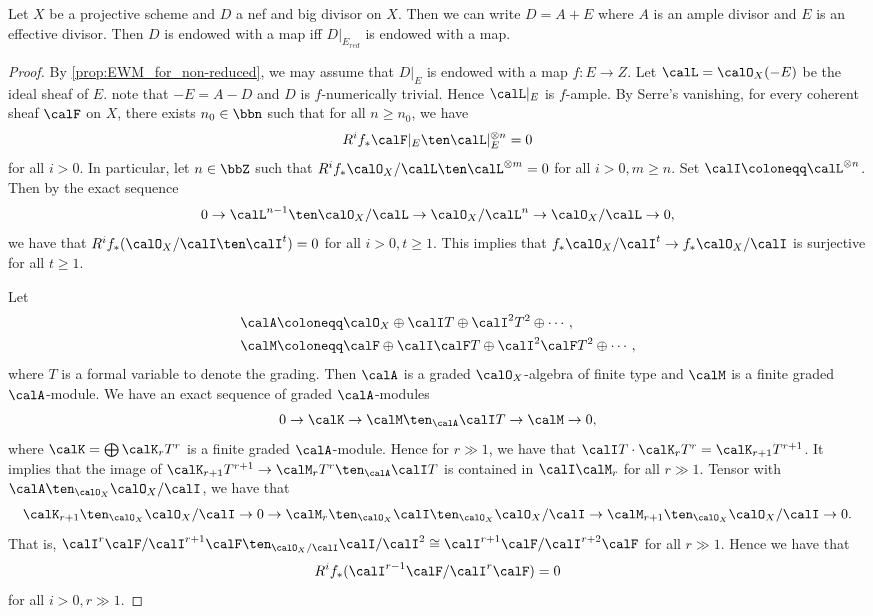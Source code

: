     \begin{proposition}\label{prop:EWM_nef_big_iff_effective_locus_char_p}
        Let \(X\) be a projective scheme and \(D\) a nef and big divisor on \(X\).
        Then we can write \(D = A + E\) where \(A\) is an ample divisor and \(E\) is an effective divisor.
        Then \(D\) is endowed with a map iff \(D|_{E_{red}}\) is endowed with a map.
    \end{proposition}
    \begin{proof}
        By \cref{prop:EWM_for_non-reduced}, we may assume that \(D|_E\) is endowed with a map \(f: E \to Z\).
        Let \(\calL = \calO_X(-E)\) be the ideal sheaf of \(E\).
        note that \(-E = A - D\) and \(D\) is \(f\)-numerically trivial.
        Hence \(\calL|_E\) is \(f\)-ample.
        By Serre's vanishing, for every coherent sheaf \(\calF\) on \(X\), 
        there exists \(n_0 \in \bbn\) such that for all \(n \geq n_0\), we have 
        \[ R^if_* \calF|_E \ten \calL|_{E}^{\otimes n} =  0 \]
        for all \(i > 0\).
        In particular, let \(n \in \bbZ\) such that \(R^if_* \calO_X/\calL \ten \calL^{\otimes m} = 0\) for all \(i > 0,m\geq n\).
        Set \(\calI \coloneqq \calL^{\otimes n}\).
        Then by the exact sequence
        \[ 0 \to \calL^{n-1} \ten \calO_X/\calL \to \calO_X/\calL^n \to \calO_X/\calL \to 0, \]
        we have that \(R^if_* (\calO_X/\calI \ten \calI^t) = 0\) for all \(i > 0, t\geq 1\).
        This implies that \(f_*\calO_X/\calI^t \to f_*\calO_X/\calI\) is surjective for all \(t \geq 1\).

        Let 
        \begin{align*}
            \calA &\coloneqq \calO_X \oplus \calI T \oplus \calI^2 T^2 \oplus \cdots, \\
            \calM &\coloneqq \calF \oplus \calI \calF T \oplus \calI^2 \calF T^2 \oplus \cdots,
        \end{align*}
        where \(T\) is a formal variable to denote the grading.
        Then \(\calA\) is a graded \(\calO_X\)-algebra of finite type and \(\calM\) is a finite graded \(\calA\)-module.
        We have an exact sequence of graded \(\calA\)-modules
        \[ 0 \to \calK \to \calM \ten_{\calA} \calI T \to \calM \to 0, \]
        where \(\calK = \bigoplus \calK_r T^r\) is a finite graded \(\calA\)-module.
        Hence for \(r \gg 1\), we have that \(\calI T \cdot \calK_r T^r = \calK_{r+1} T^{r+1}\).
        It implies that the image of \(\calK_{r+1} T^{r+1} \to \calM_r T^r \ten_{\calA} \calI T\) is contained in \(\calI \calM_r\) for all \(r \gg 1\).
        Tensor with \(\calA \ten_{\calO_X} \calO_X/\calI\), we have that
        \[ \calK_{r+1} \ten_{\calO_X} \calO_X/\calI \to 0 \to \calM_r \ten_{\calO_X} \calI \ten_{\calO_X} \calO_X/\calI \to \calM_{r+1} \ten_{\calO_X} \calO_X/\calI \to 0. \]
        That is, \(\calI^{r}\calF/\calI^{r+1}\calF \ten_{\calO_X/\calI} \calI/\calI^2 \cong \calI^{r+1}\calF/\calI^{r+2}\calF\) for all \(r \gg 1\).
        Hence we have that
        \[ R^if_* (\calI^{r-1}\calF/\calI^{r}\calF) = 0 \]
        for all \(i > 0, r \gg 1\).


\end{proof}
